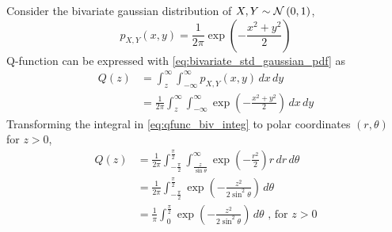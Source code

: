 \documentclass[10pt, a4paper]{article}
\begin{document}
\begin{enumerate}
\begin{equation}
\end{equation}
\solution 
\solution Consider the bivariate gaussian distribution of $X,Y \sim \mathcal{N}\left(0,1\right)$,
\begin{equation}
	p_{X,Y}(x,y) = \frac{1}{2\pi}\exp\left(-\frac{x^2+y^2}{2}\right)
	\label{eq:bivariate_std_gaussian_pdf}
\end{equation}
Q-function can be expressed with \eqref{eq:bivariate_std_gaussian_pdf} as
\begin{align}
	Q(z) &= \int_{z}^{\infty}\int_{-\infty}^{\infty} p_{X,Y}(x,y) \,dx\,dy \\
	\label{eq:qfunc_biv_integ}
	&= \frac{1}{2\pi}\int_{z}^{\infty}\int_{-\infty}^{\infty} \exp\left(-\frac{x^2+y^2}{2}\right) \,dx\,dy
\end{align}
Transforming the integral in \eqref{eq:qfunc_biv_integ} to polar coordinates $(r,\theta)$ for $z > 0$,
\begin{align}
	Q(z) &= \frac{1}{2\pi}\int_{-\frac{\pi}{2}}^{\frac{\pi}{2}}\int_{\frac{z}{\sin\theta}}^{\infty} \exp\left(-\frac{r^2}{2}\right)r \,dr\,d\theta\\
	&= \frac{1}{2\pi}\int_{-\frac{\pi}{2}}^{\frac{\pi}{2}} \exp\left(-\frac{z^2}{2\sin^2\theta}\right) \,d\theta\\
	&= \frac{1}{\pi}\int_{0}^{\frac{\pi}{2}} \exp\left(-\frac{z^2}{2\sin^2\theta}\right) \,d\theta \text{ , for $z > 0$}
\end{align}
\end{enumerate}
\end{document}

